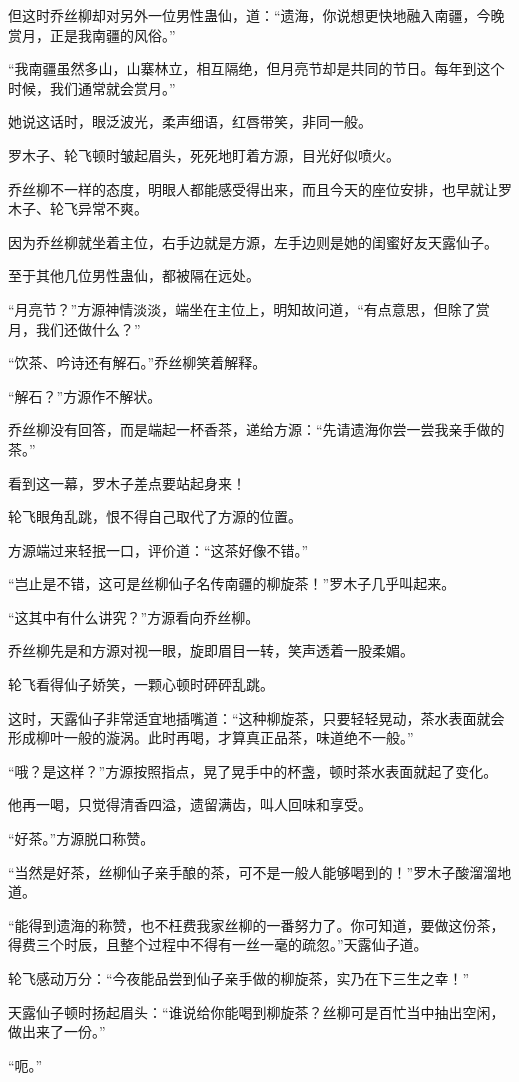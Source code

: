 \begin{this_body}
但这时乔丝柳却对另外一位男性蛊仙，道：“遗海，你说想更快地融入南疆，今晚赏月，正是我南疆的风俗。”

“我南疆虽然多山，山寨林立，相互隔绝，但月亮节却是共同的节日。每年到这个时候，我们通常就会赏月。”

她说这话时，眼泛波光，柔声细语，红唇带笑，非同一般。

罗木子、轮飞顿时皱起眉头，死死地盯着方源，目光好似喷火。

乔丝柳不一样的态度，明眼人都能感受得出来，而且今天的座位安排，也早就让罗木子、轮飞异常不爽。

因为乔丝柳就坐着主位，右手边就是方源，左手边则是她的闺蜜好友天露仙子。

至于其他几位男性蛊仙，都被隔在远处。

“月亮节？”方源神情淡淡，端坐在主位上，明知故问道，“有点意思，但除了赏月，我们还做什么？”

“饮茶、吟诗还有解石。”乔丝柳笑着解释。

“解石？”方源作不解状。

乔丝柳没有回答，而是端起一杯香茶，递给方源：“先请遗海你尝一尝我亲手做的茶。”

看到这一幕，罗木子差点要站起身来！

轮飞眼角乱跳，恨不得自己取代了方源的位置。

方源端过来轻抿一口，评价道：“这茶好像不错。”

“岂止是不错，这可是丝柳仙子名传南疆的柳旋茶！”罗木子几乎叫起来。

“这其中有什么讲究？”方源看向乔丝柳。

乔丝柳先是和方源对视一眼，旋即眉目一转，笑声透着一股柔媚。

轮飞看得仙子娇笑，一颗心顿时砰砰乱跳。

这时，天露仙子非常适宜地插嘴道：“这种柳旋茶，只要轻轻晃动，茶水表面就会形成柳叶一般的漩涡。此时再喝，才算真正品茶，味道绝不一般。”

“哦？是这样？”方源按照指点，晃了晃手中的杯盏，顿时茶水表面就起了变化。

他再一喝，只觉得清香四溢，遗留满齿，叫人回味和享受。

“好茶。”方源脱口称赞。

“当然是好茶，丝柳仙子亲手酿的茶，可不是一般人能够喝到的！”罗木子酸溜溜地道。

“能得到遗海的称赞，也不枉费我家丝柳的一番努力了。你可知道，要做这份茶，得费三个时辰，且整个过程中不得有一丝一毫的疏忽。”天露仙子道。

轮飞感动万分：“今夜能品尝到仙子亲手做的柳旋茶，实乃在下三生之幸！”

天露仙子顿时扬起眉头：“谁说给你能喝到柳旋茶？丝柳可是百忙当中抽出空闲，做出来了一份。”

“呃。”

\end{this_body}

